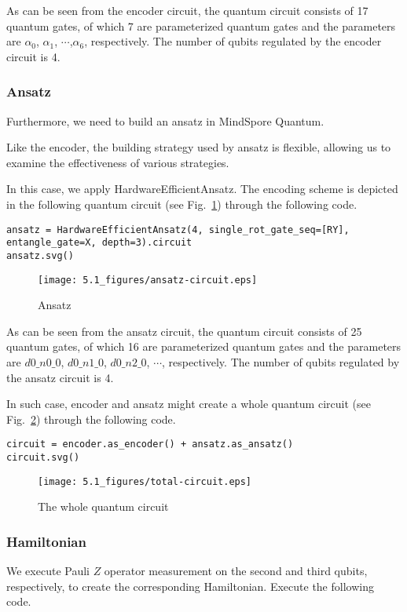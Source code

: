 As can be seen from the encoder circuit, the quantum circuit consists of 17 quantum gates, of which 7 are
parameterized quantum gates and the parameters are $\alpha_0$, $\alpha_1$, $\cdots$,$\alpha_6$, respectively. The number of qubits regulated by the encoder circuit is 4.

\subsubsection{Ansatz}
Furthermore, we need to build an ansatz in MindSpore Quantum.

Like the encoder, the building strategy used by ansatz is flexible, allowing us to examine the effectiveness of various strategies.

In this case, we apply HardwareEfficientAnsatz. The encoding scheme is depicted in the following quantum circuit (see Fig.~\ref{5.1ansatz-circuit}) through the following code.

\begin{lstlisting}
ansatz = HardwareEfficientAnsatz(4, single_rot_gate_seq=[RY], entangle_gate=X, depth=3).circuit
ansatz.svg()
\end{lstlisting}

\begin{figure}[H]
    \centering
    \texttt{[image: 5.1\_figures/ansatz-circuit.eps]}
    \caption{Ansatz}
    \label{5.1ansatz-circuit}
\end{figure}

As can be seen from the ansatz circuit, the quantum circuit consists of 25 quantum gates, of which 16 are parameterized quantum gates and the parameters are $d0\_n0\_0$, $d0\_n1\_0$, $d0\_n2\_0$, $\cdots$,  respectively. The number of qubits regulated by the ansatz circuit is 4.

In such case, encoder and ansatz might create a whole quantum circuit (see Fig.~\ref{5.1total-circuit}) through the following code.

\begin{lstlisting}
circuit = encoder.as_encoder() + ansatz.as_ansatz()
circuit.svg()
\end{lstlisting}

\begin{figure}[H]
    \centering
    \texttt{[image: 5.1\_figures/total-circuit.eps]}
    \caption{The whole quantum circuit}
    \label{5.1total-circuit}
\end{figure}

\subsubsection{Hamiltonian}
We execute Pauli $Z$ operator measurement on the second and third qubits, respectively, to create the corresponding Hamiltonian. Execute the following code.

